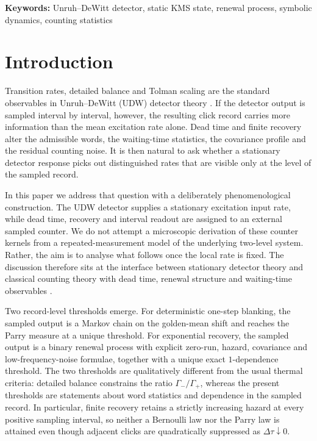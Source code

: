 \documentclass[11pt]{article}
\theoremstyle{definition}
\begin{document}
\noindent\textbf{Keywords:} Unruh--DeWitt detector, static KMS state, renewal process, symbolic dynamics, counting statistics

\section{Introduction}

Transition rates, detailed balance and Tolman scaling are the standard observables in Unruh--DeWitt (UDW) detector theory \cite{Unruh1976,DeWitt1979,BirDav1982,Takagi1986,CrispinoHiguchiMatsas2008,LoukoSatz2006,LoukoSatz2008}. If the detector output is sampled interval by interval, however, the resulting click record carries more information than the mean excitation rate alone. Dead time and finite recovery alter the admissible words, the waiting-time statistics, the covariance profile and the residual counting noise. It is then natural to ask whether a stationary detector response picks out distinguished rates that are visible only at the level of the sampled record.

In this paper we address that question with a deliberately phenomenological construction. The UDW detector supplies a stationary excitation input rate, while dead time, recovery and interval readout are assigned to an external sampled counter. We do not attempt a microscopic derivation of these counter kernels from a repeated-measurement model of the underlying two-level system. Rather, the aim is to analyse what follows once the local rate is fixed. The discussion therefore sits at the interface between stationary detector theory \cite{LoukoSatz2006,LoukoSatz2008,Fewster2020,PranziniEtAl2024,PranziniKeskiVakkuri2025AQFT,PoloGomezEtAl2022,TjoaEtAl2023click,FewsterJuarezLouko2016,GarayMartinMartinezRamon2016} and classical counting theory with dead time, renewal structure and waiting-time observables \cite{Muller1973,CantorTeich1975,CarmichaelWaiting1989,KimbleAntibunching1977,Brandes2008,BrudererEtAl2014,AaronsonGilatKeaneDeValk1989,Janson1984,Cinlar1975}.

Two record-level thresholds emerge. For deterministic one-step blanking, the sampled output is a Markov chain on the golden-mean shift and reaches the Parry measure at a unique threshold. For exponential recovery, the sampled output is a binary renewal process with explicit zero-run, hazard, covariance and low-frequency-noise formulae, together with a unique exact $1$-dependence threshold. The two thresholds are qualitatively different from the usual thermal criteria: detailed balance constrains the ratio $\Gamma_-/\Gamma_+$, whereas the present thresholds are statements about word statistics and dependence in the sampled record. In particular, finite recovery retains a strictly increasing hazard at every positive sampling interval, so neither a Bernoulli law nor the Parry law is attained even though adjacent clicks are quadratically suppressed as $\Delta\tau\downarrow0$.
\end{document}

